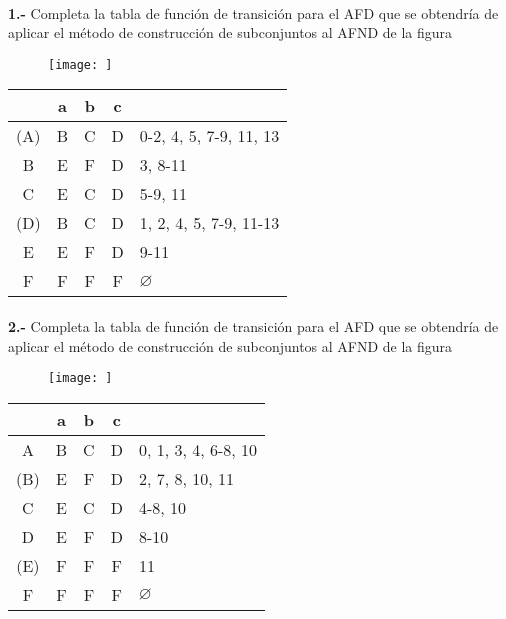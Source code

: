 \documentclass[11pt,a4paper]{report}
\begin{document}
\paragraph{}

\paragraph{}
\textbf{1.-} Completa la tabla de función de transición para el AFD que se obtendría de aplicar el método de construcción de subconjuntos al AFND de la figura
\begin{figure}[ht!]
\centering
\texttt{[image: ]}
\end{figure}

\begin{tabular} {| c | c |c |c | l |}
\hline 
& a & b & c & \\ \hline
(A) & B & C & D & 0-2, 4, 5, 7-9, 11, 13\\ \hline
B & E & F & D & 3, 8-11\\ \hline
C & E & C & D & 5-9, 11\\ \hline
(D) & B & C & D & 1, 2, 4, 5, 7-9, 11-13\\ \hline
E & E & F & D & 9-11\\ \hline
F & F & F & F & $\varnothing$\\ \hline
\end{tabular}\paragraph{}
\textbf{2.-} Completa la tabla de función de transición para el AFD que se obtendría de aplicar el método de construcción de subconjuntos al AFND de la figura
\begin{figure}[ht!]
\centering
\texttt{[image: ]}
\end{figure}

\begin{tabular} {| c | c |c |c | l |}
\hline 
& a & b & c & \\ \hline
A & B & C & D & 0, 1, 3, 4, 6-8, 10\\ \hline
(B) & E & F & D & 2, 7, 8, 10, 11\\ \hline
C & E & C & D & 4-8, 10\\ \hline
D & E & F & D & 8-10\\ \hline
(E) & F & F & F & 11\\ \hline
F & F & F & F & $\varnothing$\\ \hline
\end{tabular}
\end{document}
